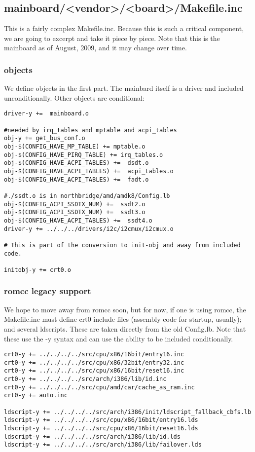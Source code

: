 \documentclass[10pt,letterpaper]{article}
\begin{document}
\subsection{mainboard/<vendor>/<board>/Makefile.inc}
This is a fairly complex Makefile.inc. Because this is such a critical component, we are going to excerpt and take it piece by piece. 
Note that this is the mainboard as of August, 2009, and it may change over time. 
\subsubsection{objects}
We define objects in the first part. The mainbard itself is a driver and included unconditionally. Other objects are conditional: 
\begin{verbatim}
driver-y +=  mainboard.o

#needed by irq_tables and mptable and acpi_tables
obj-y += get_bus_conf.o
obj-$(CONFIG_HAVE_MP_TABLE) += mptable.o
obj-$(CONFIG_HAVE_PIRQ_TABLE) += irq_tables.o
obj-$(CONFIG_HAVE_ACPI_TABLES) +=  dsdt.o
obj-$(CONFIG_HAVE_ACPI_TABLES) +=  acpi_tables.o
obj-$(CONFIG_HAVE_ACPI_TABLES) +=  fadt.o

#./ssdt.o is in northbridge/amd/amdk8/Config.lb
obj-$(CONFIG_ACPI_SSDTX_NUM) +=  ssdt2.o
obj-$(CONFIG_ACPI_SSDTX_NUM) +=  ssdt3.o
obj-$(CONFIG_HAVE_ACPI_TABLES) +=  ssdt4.o
driver-y += ../../../drivers/i2c/i2cmux/i2cmux.o

# This is part of the conversion to init-obj and away from included code. 

initobj-y += crt0.o
\end{verbatim}
\subsubsection{romcc legacy support}
We hope to move away from romcc soon, but for now, if one is using romcc, the Makefile.inc must define 
crt0 include files (assembly code for startup, usually); and several ldscripts. These are taken directly from the 
old Config.lb. Note that these use the -y syntax and can use the ability to be included conditionally. 
\begin{verbatim}
crt0-y += ../../../../src/cpu/x86/16bit/entry16.inc
crt0-y += ../../../../src/cpu/x86/32bit/entry32.inc
crt0-y += ../../../../src/cpu/x86/16bit/reset16.inc
crt0-y += ../../../../src/arch/i386/lib/id.inc
crt0-y += ../../../../src/cpu/amd/car/cache_as_ram.inc
crt0-y += auto.inc

ldscript-y += ../../../../src/arch/i386/init/ldscript_fallback_cbfs.lb
ldscript-y += ../../../../src/cpu/x86/16bit/entry16.lds
ldscript-y += ../../../../src/cpu/x86/16bit/reset16.lds
ldscript-y += ../../../../src/arch/i386/lib/id.lds
ldscript-y += ../../../../src/arch/i386/lib/failover.lds

\end{verbatim}
\end{document}
